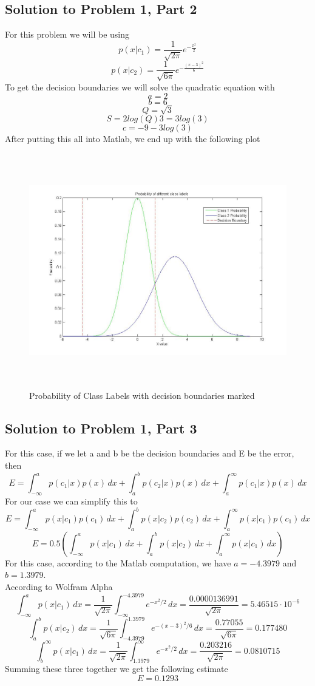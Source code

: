 \documentclass[11pt,psfig]{article}
\begin{document}
\subsection*{Solution to Problem 1, Part 2}

For this problem we will be using
\[
p(x|c_1) = \frac{1}{\sqrt{2\pi}} e^{- \frac{x^2}{2}}
\]
\[
p(x|c_2) = \frac{1}{\sqrt{6\pi}} e^{- \frac{(x-3)^2}{6}}
\]
To get the decision boundaries we will solve the quadratic equation with
\[
a = 2
\]
\[
b = 6
\]
\[
Q = \sqrt{3}
\]
\[
S = 2 log(Q) 3 = 3log(3)
\]
\[
c = -9 - 3 log(3)
\]
After putting this all into Matlab, we end up with the following plot
\begin{figure}[H]
\centering
\includegraphics[height=4in]{prob1plot.jpg}
\caption{Probability of Class Labels with decision boundaries marked}
\end{figure}

\subsection*{Solution to Problem 1, Part 3}

For this case, if we let a and b be the decision boundaries and E be the error, then
\[
E = \int_{-\infty}^{a}{p(c_1|x)p(x) \, dx} + \int_{a}^{b}{p(c_2|x)p(x) \, dx} + \int_{a}^{\infty}{p(c_1|x)p(x) \, dx}
\]
For our case we can simplify this to
\[
E = \int_{-\infty}^{a}{p(x|c_1)p(c_1) \, dx} + \int_{a}^{b}{p(x|c_2)p(c_2) \, dx} + \int_{a}^{\infty}{p(x|c_1)p(c_1) \, dx}
\]
\[
E = 0.5(\int_{-\infty}^{a}{p(x|c_1) \, dx} + \int_{a}^{b}{p(x|c_2) \, dx} + \int_{a}^{\infty}{p(x|c_1) \, dx})
\]
For this case, according to the Matlab computation, we have $a=-4.3979$ and $b=1.3979$. \\
According to Wolfram Alpha
\[
\int_{-\infty}^{a}{p(x|c_1) \, dx} = \frac{1}{\sqrt{2\pi}} \int_{-\infty}^{-4.3979}{e^{-x^2/2} \, dx} = \frac{0.0000136991}{\sqrt{2\pi}} = 5.46515 \cdot 10^{-6}
\]
\[
\int_{a}^{b}{p(x|c_2) \, dx} = \frac{1}{\sqrt{6\pi}} \int_{-4.3979}^{1.3979}{e^{-(x-3)^2/6} \, dx} = \frac{0.77055}{\sqrt{6\pi}} = 0.177480
\]
\[
\int_{b}^{\infty}{p(x|c_1) \, dx} = \frac{1}{\sqrt{2\pi}} \int_{1.3979}^{\infty}{e^{-x^2/2} \, dx} = \frac{0.203216}{\sqrt{2\pi}} = 0.0810715
\]
Summing these three together we get the following estimate
\[
E = 0.1293
\]
\end{document}
